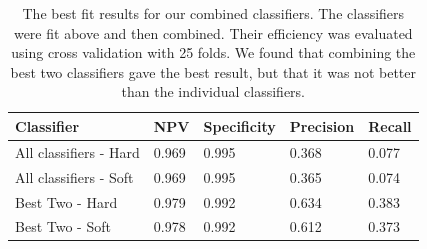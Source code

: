 \begin{table}
\centering
 \begin{tabular}{|l |l |l |l |l |}
\hline
Classifier &NPV & Specificity &Precision & Recall  \\ \hline
All classifiers - Hard & 0.969&  0.995&  0.368&  0.077\\
All classifiers  - Soft & 0.969 &  0.995&  0.365&   0.074\\ 
Best Two - Hard & 0.979&  0.992&  0.634&  0.383\\
Best Two  - Soft &0.978&  0.992 & 0.612 &  0.373\\ \hline
\end{tabular}
\caption{The best fit results for our combined classifiers. The classifiers were fit above and then combined. Their efficiency was evaluated using cross validation with 25 folds. We found that combining the best two classifiers gave the best result, but that it was not better than the individual classifiers.}
\label{table:votingClassifiers}
\end{table}
